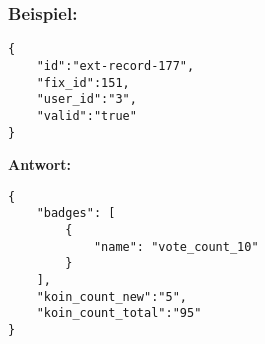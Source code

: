 \subsubsection{Beispiel:}

\lstset{language=JavaScript}
\begin{lstlisting}[style=examples]
{
	"id":"ext-record-177",
	"fix_id":151,
	"user_id":"3",
	"valid":"true"
}
\end{lstlisting}

\textbf{Antwort:}

\lstset{language=JavaScript}
\begin{lstlisting}[style=examples]
{
	"badges": [
		{
			"name": "vote_count_10"
		}
	],
	"koin_count_new":"5",
	"koin_count_total":"95"
}
\end{lstlisting}